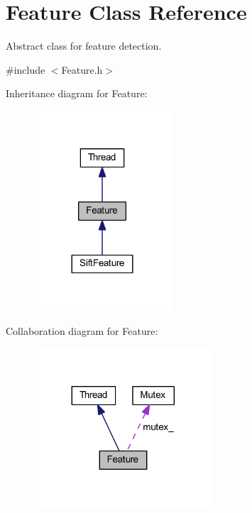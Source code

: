 \hypertarget{class_feature}{\section{Feature Class Reference}
\label{class_feature}
}


Abstract class for feature detection.  




{\ttfamily \#include $<$Feature.\-h$>$}



Inheritance diagram for Feature\-:
\nopagebreak
\begin{figure}[H]
\begin{center}
\leavevmode
\includegraphics[width=144pt]{class_feature__inherit__graph}
\end{center}
\end{figure}


Collaboration diagram for Feature\-:
\nopagebreak
\begin{figure}[H]
\begin{center}
\leavevmode
\includegraphics[width=188pt]{class_feature__coll__graph}
\end{center}
\end{figure}
